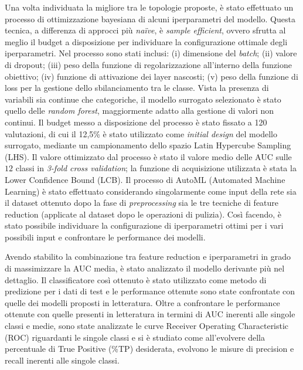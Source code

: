 Una volta individuata la migliore tra le topologie proposte, è stato effettuato un processo di ottimizzazione bayesiana di alcuni iperparametri del modello. 
Questa tecnica, a differenza di approcci più \textit{na\"ive}, è \textit{sample efficient}, ovvero sfrutta al meglio il budget a disposizione per individuare la configurazione ottimale degli iperparametri. 
Nel processo sono stati inclusi: (i) dimensione del \textit{batch}; (ii) valore di dropout; (iii) peso della funzione di regolarizzazione all'interno della funzione obiettivo; (iv) funzione di attivazione dei layer nascosti; (v) peso della funzione di loss per la gestione dello sbilanciamento tra le classe.
Vista la presenza di variabili sia continue che categoriche, il modello surrogato selezionato è stato quello delle \textit{random forest}, maggiormente adatto alla gestione di valori non continui. 
Il budget messo a disposizione del processo è stato fissato a 120 valutazioni, di cui il 12,5\% è stato utilizzato come \textit{initial design} del modello surrogato, mediante un campionamento dello spazio Latin Hypercube Sampling (LHS). 
Il valore ottimizzato dal processo è stato il valore medio delle AUC sulle $12$ classi in \textit{3-fold cross validation}; la funzione di acquisizione utilizzata è stata la Lower Confidence Bound (LCB).
Il processo di AutoML (Automated Machine Learning) è stato effettuato considerando singolarmente come input della rete sia il dataset ottenuto dopo la fase di \textit{preprocessing} sia le tre tecniche di feature reduction (applicate al dataset dopo le operazioni di pulizia).
Così facendo, è stato possibile individuare la configurazione di iperparametri ottimi per i vari possibili input e confrontare le performance dei modelli.

Avendo stabilito la combinazione tra feature reduction e iperparametri in grado di massimizzare la AUC media, è stato analizzato il modello derivante più nel dettaglio.%
Il classificatore così ottenuto è stato utilizzato come metodo di predizione per i dati di test e le performance ottenute sono state confrontate con quelle dei modelli proposti in letteratura.
Oltre a confrontare le performance ottenute con quelle presenti in letteratura in termini di AUC inerenti alle singole classi e medie, sono state analizzate le curve Receiver Operating Characteristic (ROC) riguardanti le singole classi e si è studiato come all'evolvere della percentuale di True Positive (\%TP) desiderata, evolvono le misure di precision e recall inerenti alle singole classi.